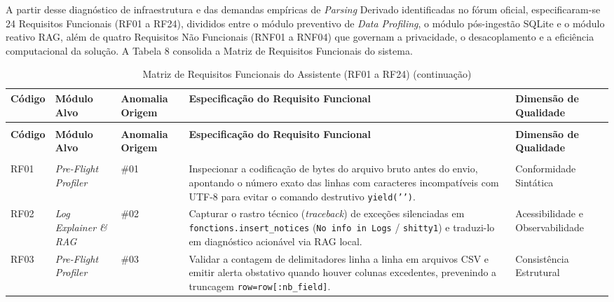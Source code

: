 \documentclass[
	oneside,
	a4paper,
	12pt,
	chapter=TITLE,
	section=TITLE,
	english,
	brazilian
]{abntex2}
\begin{document}
A partir desse diagnóstico de infraestrutura e das demandas empíricas de \textit{Parsing} Derivado identificadas no fórum oficial, especificaram-se 24 Requisitos Funcionais (RF01 a RF24), divididos entre o módulo preventivo de \textit{Data Profiling}, o módulo pós-ingestão SQLite e o módulo reativo RAG, além de quatro Requisitos Não Funcionais (RNF01 a RNF04) que governam a privacidade, o desacoplamento e a eficiência computacional da solução. A Tabela 8 consolida a Matriz de Requisitos Funcionais do sistema.

{
\footnotesize
\setlength{\tabcolsep}{3pt}
\begin{xltabular}{\textwidth}{|>{\centering\arraybackslash}p{1.4cm}|>{\raggedright\arraybackslash}p{2.4cm}|>{\centering\arraybackslash}p{1.6cm}|>{\raggedright\arraybackslash}X|>{\raggedright\arraybackslash}p{2.8cm}|}
  \caption{Matriz de Requisitos Funcionais do Assistente (RF01 a RF24)}\label{tab:tabela_8}\\
  \hline
  \textbf{Código} & \textbf{Módulo Alvo} & \textbf{Anomalia Origem} & \textbf{Especificação do Requisito Funcional} & \textbf{Dimensão de Qualidade \cite{Wang1996}} \\ \hline
  \endfirsthead
  \caption[]{Matriz de Requisitos Funcionais do Assistente (RF01 a RF24) (continuação)}\\
  \hline
  \textbf{Código} & \textbf{Módulo Alvo} & \textbf{Anomalia Origem} & \textbf{Especificação do Requisito Funcional} & \textbf{Dimensão de Qualidade \cite{Wang1996}} \\ \hline
  \endhead
  \hline
   \\
  \endfoot
  \hline
  \endlastfoot
  RF01 & \textit{Pre-Flight Profiler} & \#01 & Inspecionar a codificação de bytes do arquivo bruto antes do envio, apontando o número exato das linhas com caracteres incompatíveis com UTF-8 para evitar o comando destrutivo \texttt{yield('{}')}. & Conformidade Sintática \\ \hline
  RF02 & \textit{Log Explainer \& RAG} & \#02 & Capturar o rastro técnico (\textit{traceback}) de exceções silenciadas em \texttt{fonctions.\allowbreak insert\_\allowbreak notices} (\texttt{No info in Logs} / \texttt{shitty1}) e traduzi-lo em diagnóstico acionável via RAG local. & Acessibilidade e Observabilidade \\ \hline
  RF03 & \textit{Pre-Flight Profiler} & \#03 & Validar a contagem de delimitadores linha a linha em arquivos CSV e emitir alerta obstativo quando houver colunas excedentes, prevenindo a truncagem \texttt{row=row[:nb\_\allowbreak field]}. & Consistência Estrutural \\ \hline

\end{xltabular}}
\end{document}

